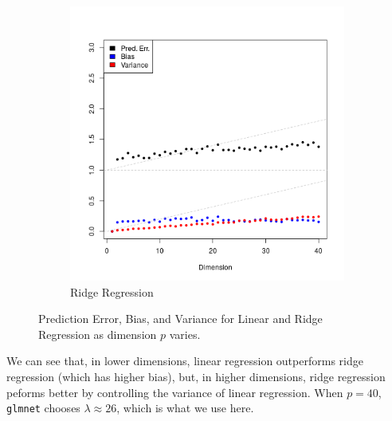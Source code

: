 \documentclass[12pt]{article}
\begin{document}
\begin{figure}[h!]
\begin{subfigure}[b]{0.49\textwidth}
  \includegraphics[width=1.05\textwidth]{ridge}
  \vspace{-8mm}
  \caption{Ridge Regression}
  \end{subfigure}
\hfill
\vspace{-2mm}
\caption{Prediction Error, Bias, and Variance for Linear and Ridge
Regression as dimension $p$ varies.}
\label{fig:problem1}
\end{figure}

We can see that, in lower dimensions, linear regression outperforms ridge
regression (which has higher bias), but, in higher dimensions, ridge regression
peforms better by controlling the variance of linear regression. When $p = 40$,
\texttt{glmnet} chooses $\lambda \approx 26$, which is what we use here.

\newpage
\end{document}
